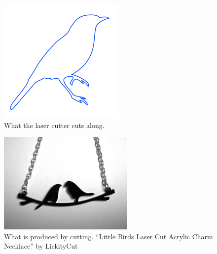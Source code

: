 \documentclass[12pt singlecol]{article}
\begin{document}
\begin{flushleft}
\begin{figure}
  \centering  
  \includegraphics[width=\linewidth]{cutting-line}
  \caption{What the laser cutter cuts along. \cite{PonokoStarter13}}
  \label{fig:cutline}
\end{figure}

\begin{figure}
  \centering  
  \includegraphics[width=\linewidth]{cut-birds}
  \caption{What is produced by cutting. ``Little Birds Laser Cut Acrylic Charm Necklace'' by LickityCut \cite{licketycut13}}
  \label{fig:birds}
\end{figure}	


\end{flushleft}
\end{document}

